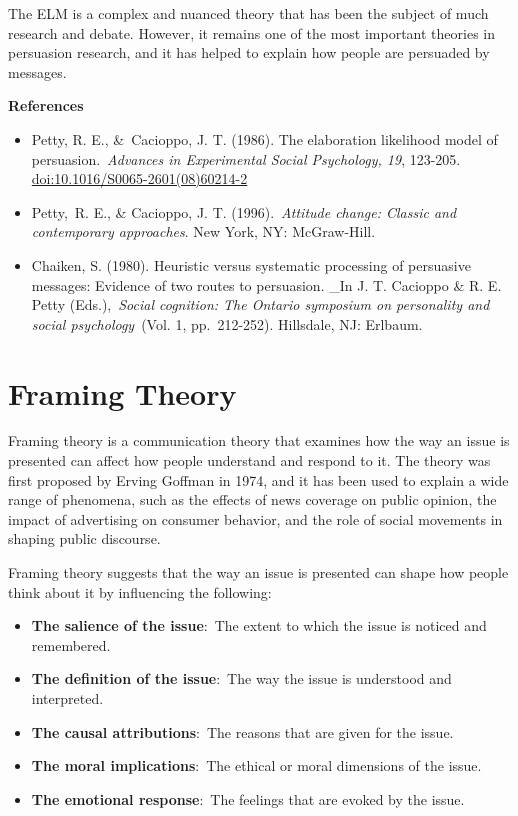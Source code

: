 \documentclass[
  b5paper]{book}
\begin{document}
The ELM is a complex and nuanced theory that has been the subject of much research and debate. However, it remains one of the most important theories in persuasion research, and it has helped to explain how people are persuaded by messages.

\textbf{References}

\begin{itemize}
\item
  Petty, R. E., \&~Cacioppo, J. T. (1986). The elaboration likelihood model of persuasion.~\emph{Advances in Experimental Social Psychology, 19}, 123-205. \url{doi:10.1016/S0065-2601(08)60214-2}
\item
  Petty,~R. E., \& Cacioppo, J. T. (1996).~\emph{Attitude change: Classic and contemporary approaches}. New York, NY: McGraw-Hill.
\item
  Chaiken, S. (1980). Heuristic versus systematic processing of persuasive messages: Evidence of two routes to persuasion. \_In J. T. Cacioppo \& R. E. Petty (Eds.),~\emph{Social cognition: The Ontario symposium on personality and social psychology}~(Vol. 1, pp.~212-252). Hillsdale, NJ: Erlbaum.
\end{itemize}

\hypertarget{framing-theory}{%
\section{Framing Theory}\label{framing-theory}}

Framing theory is a communication theory that examines how the way an issue is presented can affect how people understand and respond to it. The theory was first proposed by Erving Goffman in 1974, and it has been used to explain a wide range of phenomena, such as the effects of news coverage on public opinion, the impact of advertising on consumer behavior, and the role of social movements in shaping public discourse.

Framing theory suggests that the way an issue is presented can shape how people think about it by influencing the following:

\begin{itemize}
\item
  \textbf{The salience of the issue}:~The extent to which the issue is noticed and remembered.
\item
  \textbf{The definition of the issue}:~The way the issue is understood and interpreted.
\item
  \textbf{The causal attributions}:~The reasons that are given for the issue.
\item
  \textbf{The moral implications}:~The ethical or moral dimensions of the issue.
\item
  \textbf{The emotional response}:~The feelings that are evoked by the issue.
\end{itemize}
\end{document}
